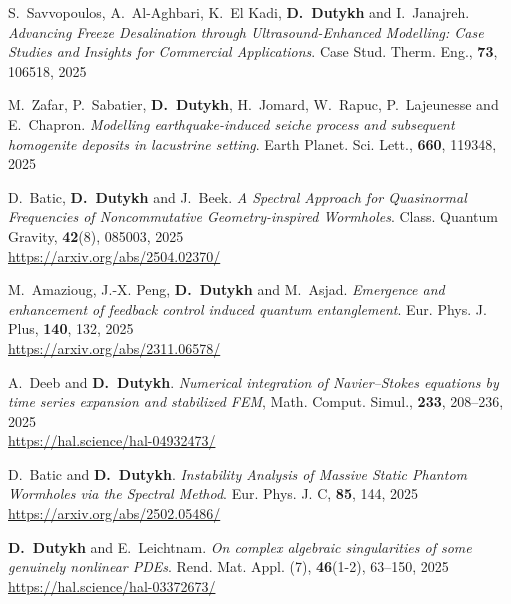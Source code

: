 \begin{etaremune}
  \item S.~Savvopoulos, A.~Al-Aghbari, K.~El Kadi, \textbf{D.~Dutykh} and I.~Janajreh. \textit{Advancing Freeze Desalination through Ultrasound-Enhanced Modelling: Case Studies and Insights for Commercial Applications}. Case Stud. Therm. Eng., \textbf{73}, 106518, 2025 %

  \item M.~Zafar, P.~Sabatier, \textbf{D.~Dutykh}, H.~Jomard, W.~Rapuc, P.~Lajeunesse and E.~Chapron. \textit{Modelling earthquake-induced seiche process and subsequent homogenite deposits in lacustrine setting}. Earth Planet. Sci. Lett., \textbf{660}, 119348, 2025 %

  \item D.~Batic, \textbf{D.~Dutykh} and J.~Beek. \textit{A Spectral Approach for Quasinormal Frequencies of Noncommutative Geometry-inspired Wormholes}. Class. Quantum Gravity, \textbf{42}(8), 085003, 2025 \\ %
  \url{https://arxiv.org/abs/2504.02370/}

  \item M.~Amazioug, J.-X. Peng, \textbf{D.~Dutykh} and M.~Asjad. \textit{Emergence and enhancement of feedback control induced quantum entanglement}. Eur. Phys. J. Plus, \textbf{140}, 132, 2025 \\ %
  \url{https://arxiv.org/abs/2311.06578/}

  \item A.~Deeb and \textbf{D.~Dutykh}. \textit{Numerical integration of Navier--Stokes equations by time series expansion and stabilized FEM}, Math. Comput. Simul., \textbf{233}, 208--236, 2025 \\ %
  \url{https://hal.science/hal-04932473/}

  \item D.~Batic and \textbf{D.~Dutykh}. \textit{Instability Analysis of Massive Static Phantom Wormholes via the Spectral Method}. Eur. Phys. J. C, \textbf{85}, 144, 2025 \\ %
  \url{https://arxiv.org/abs/2502.05486/}

  \item \textbf{D.~Dutykh} and E.~Leichtnam. \textit{On complex algebraic singularities of some genuinely nonlinear PDEs}. Rend. Mat. Appl. (7), \textbf{46}(1-2), 63--150, 2025 \\ %
  \url{https://hal.science/hal-03372673/}


\end{etaremune}
